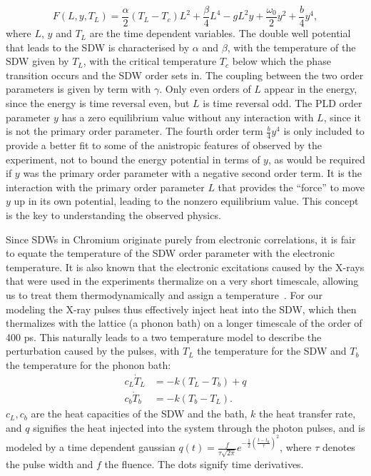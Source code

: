 \begin{equation}
	\label{eq:Cr_landau}
	F(L, y, T_L) = \frac{\alpha}{2}(T_L - T_c) L^2 + \frac{\beta}{4} L^4 - g L^2 y + \frac{\omega_0}{2} y^2 + \frac{b}{4} y^4,
\end{equation}
where $L$, $y$ and $T_L$ are the time dependent variables.
The double well potential that leads to the SDW is characterised by $\alpha$ and $\beta$, with the temperature of the SDW given by $T_L$, with the critical temperature $T_c$ below which the phase transition occurs and the SDW order sets in. The coupling between the two order parameters is given by term with $\gamma$. Only even orders of $L$ appear in the energy, since the energy is time reversal even, but $L$ is time reversal odd. The PLD order parameter $y$ has a zero equilibrium value without any interaction with $L$, since it is not the primary order parameter. The fourth order term $\frac{b}{4}y^4$ is only included to provide a better fit to some of the anistropic features of observed by the experiment, not to bound the energy potential in terms of $y$, as would be required if $y$ was the primary order parameter with a negative second order term.
It is the interaction with the primary order parameter $L$ that provides the ``force'' to move $y$ up in its own potential, leading to the nonzero equilibrium value. This concept is the key to understanding the observed physics.

Since SDWs in Chromium originate purely from electronic correlations, it is fair to equate the temperature of the SDW order parameter with the electronic temperature.
It is also known that the electronic excitations caused by the X-rays that were used in the experiments thermalize on a very short timescale, allowing us to treat them thermodynamically and assign a temperature~\cite{Nicholson2016}.
For our modeling the X-ray pulses thus effectively inject heat into the SDW, which then thermalizes with the lattice (a phonon bath) on a longer timescale of the order of 400 ps.
This naturally leads to a two temperature model to describe the perturbation caused by the pulses, with $T_L$ the temperature for the SDW and $T_b$ the temperature for the phonon bath:
\begin{align}
	\label{eq:Cr_twotemp}
	c_L \dot{T}_L &= -k(T_L - T_b) + q \\
	c_b \dot{T}_b &= -k(T_b - T_L).\nonumber
\end{align}
$c_L, c_b$ are the heat capacities of the SDW and the bath, $k$ the heat transfer rate, and $q$ signifies the heat injected into the system through the photon pulses, and is modeled by a time dependent gaussian $q(t) = \frac{f}{\tau \sqrt{2\pi}} e^{-\frac{1}{2}\left(\frac{t-t_0}{\tau}\right)^2}$, where $\tau$ denotes the pulse width and $f$ the fluence.
The dots signify time derivatives.

